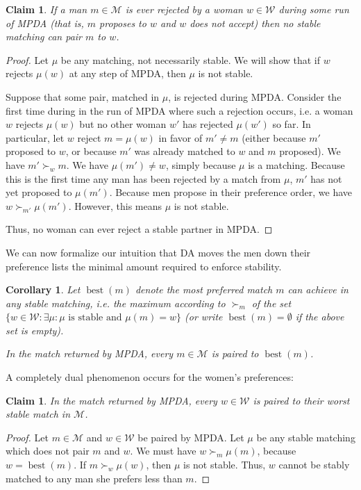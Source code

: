 \documentclass[12pt]{article}
\DeclareMathOperator*{\best}{best}
\newcommand{\M}{\mathcal{M}}
\newcommand{\W}{\mathcal{W}}
\newtheorem{corollary}[definition]{Corollary}
\newtheorem{claim}[definition]{Claim}
\begin{document}
  \begin{claim}\label{claimRejectionUnstable}
    If a man $m\in \M$ is ever rejected by a woman $w\in \W$ during some run
    of MPDA (that is, $m$ proposes to $w$ and $w$ does not accept) then no stable
    matching can pair $m$ to $w$.
  \end{claim}
  \begin{proof}
    Let $\mu$ be any matching, not necessarily stable. We will show that if $w$
    rejects $\mu(w)$ at any step of MPDA, then $\mu$ is not stable.

    Suppose that some pair, matched in $\mu$, is rejected during MPDA.
    Consider the first time during in the run of MPDA where such a rejection
    occurs, i.e. a woman $w$ rejects $\mu(w)$ but no other woman $w'$ has
    rejected $\mu(w')$ so far.
    In particular, let $w$ reject $m=\mu(w)$ in favor of $m'\ne m$
    (either because $m'$ proposed to $w$,
    or because $m'$ was already matched to $w$ and $m$ proposed).
    We have $m'\succ_w m$.
    We have $\mu(m')\ne w$, simply because $\mu$ is a matching.
    Because this is the first time any man has been rejected by a match from
    $\mu$, $m'$ has not yet proposed to $\mu(m')$.
    Because men propose in their preference order, we have $w \succ_{m'} \mu(m')$.
    However, this means $\mu$ is not stable.

    Thus, no woman can ever reject a stable partner in MPDA.
  \end{proof}

  We can now formalize our intuition that DA moves the men down their preference
  lists the minimal amount required to enforce stability.

  \begin{corollary}
    Let $\best(m)$ denote the most preferred match $m$ can achieve in any stable
    matching, i.e. the maximum according to $\succ_m$ of the set
    $\{w\in \W: \exists \mu:\text{$\mu$ is stable and $\mu(m)=w$}\}$
    (or write $\best(m)=\emptyset$ if the above set is empty).

    In the match returned by MPDA, every $m\in \M$ is paired to $\best(m)$.
  \end{corollary}

  A completely dual phenomenon occurs for the women's preferences:
  \begin{claim}\label{claimWomenWorstStable}
    In the match returned by MPDA, every $w\in \W$ is paired to their worst stable
    match in $\M$.
  \end{claim}
  \begin{proof}
    Let $m\in \M$ and $w\in \W$ be paired by MPDA.
    Let $\mu$ be any stable matching which does not pair $m$ and $w$.
    We must have $w \succ_m \mu(m)$, because $w=\best(m)$.
    If $m \succ_w \mu(w)$, then $\mu$ is not stable.
    Thus, $w$ cannot be stably matched to any man she prefers less than $m$.
  \end{proof}
\end{document}

